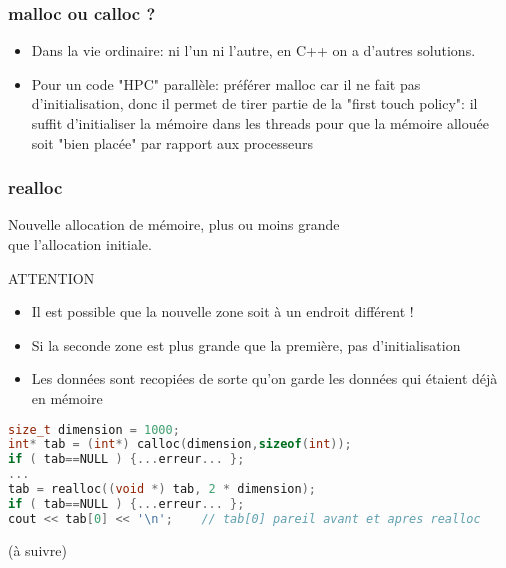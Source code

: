 \documentclass{beamer}
\begin{document}
\begin{frame}[fragile=singleslide,shrink=20]
\frametitle{malloc ou calloc ?}

\begin{itemize}
\item{Dans la vie ordinaire: ni l'un ni l'autre, en C++ on a d'autres solutions}.
\item{Pour un code "HPC" parallèle: préférer malloc car il ne fait pas d'initialisation,
donc il permet de tirer partie de la "first touch policy": il suffit d'initialiser la mémoire
dans les threads pour que la mémoire allouée soit "bien placée" par rapport aux processeurs}
\end{itemize}

\end{frame}

\begin{frame}[fragile=singleslide,shrink=20]
\frametitle{realloc}
Nouvelle allocation de mémoire, plus ou moins grande \\
que l'allocation initiale.

\begin{block}{ATTENTION}
\begin{itemize}
\item{Il est possible que la nouvelle zone soit à un endroit différent !}
\item{Si la seconde zone est plus grande que la première, pas d'initialisation}
\item{Les données sont recopiées de sorte qu'on garde les données qui étaient déjà en mémoire}
\end{itemize}
\begin{lstlisting}[language=c++]
size_t dimension = 1000;
int* tab = (int*) calloc(dimension,sizeof(int));
if ( tab==NULL ) {...erreur... };
...
tab = realloc((void *) tab, 2 * dimension);
if ( tab==NULL ) {...erreur... };
cout << tab[0] << '\n';    // tab[0] pareil avant et apres realloc
\end{lstlisting}
\end{block}
\end{frame}


\begin{frame}
(à suivre)
\end{frame}
\end{document}
